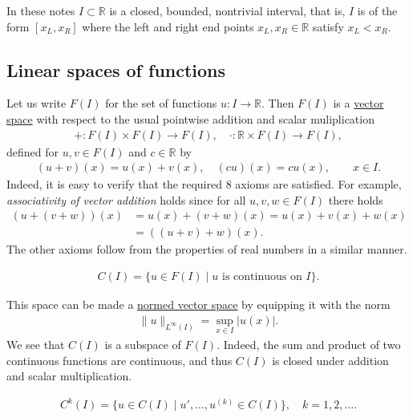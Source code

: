 \documentclass[12pt,oneside,final]{amsart}
\def\R{\mathbb R}
\begin{document}
In these notes $I \subset \R$ is a closed, bounded, nontrivial interval, that is, $I$ is of the form $[x_L, x_R]$
where the left and right end points $x_L, x_R \in \R$ satisfy $x_L < x_R$. 

\subsection{Linear spaces of functions}

Let us write $F(I)$ for the set of functions $u : I \to \mathbb R$. Then $F(I)$ is a 
\href{https://en.wikipedia.org/wiki/Vector_space#Notation_and_definition}{vector space} with respect to the usual pointwise addition and scalar muliplication
    \begin{align*}
+ : F(I) \times F(I) \to F(I), \quad \cdot : \mathbb R \times F(I) \to F(I),
    \end{align*}
defined for $u,v \in F(I)$ and $c \in \mathbb R$ by
    \begin{align*}
(u + v)(x) = u(x) + v(x), \quad (cu)(x) = cu(x), \qquad x \in I.
    \end{align*}
Indeed, it is easy to verify that the required 8 axioms are satisfied. For example, {\em associativity of vector addition} holds since for all $u,v,w \in F(I)$ there holds
    \begin{align*}
(u + (v + w))(x) 
&= 
u(x) + (v+w)(x) 
= 
u(x) + v(x) + w(x) 
\\&= 
((u + v) + w)(x).
    \end{align*}
The other axioms follow from the properties of real numbers in a similar manner.

\begin{definition}
    \begin{align*}
C(I) = \{ u \in F(I) \mid \text{$u$ is continuous on $I$}\}.
    \end{align*}
\end{definition}

This space can be made a \href{https://en.wikipedia.org/wiki/Normed_vector_space}{normed vector space} by equipping it with the norm 
    \begin{align*}
\|u\|_{L^\infty(I)} = \sup_{x \in I} |u(x)|.
    \end{align*}
We see that $C(I)$ is a subspace of $F(I)$. Indeed, the sum and product of two continuous functions are continuous, and thus $C(I)$ is closed under addition and scalar multiplication. 

\begin{definition}
    \begin{align*}
C^k(I) = \{ u \in C(I) \mid u', \dots, u^{(k)} \in C(I)\}, \quad k = 1,2,\dots.
    \end{align*}
\end{definition}
\end{document}
